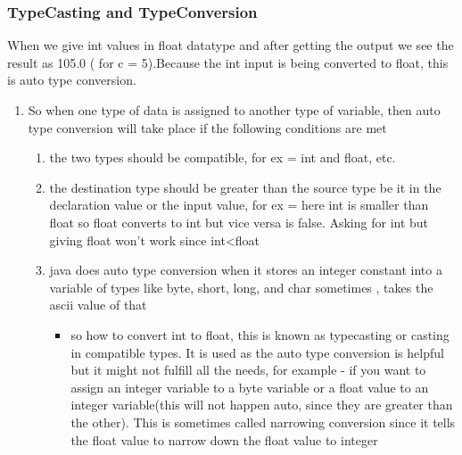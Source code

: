 \documentclass[11pt]{article}
\begin{document}
\subsubsection{TypeCasting and TypeConversion}
\label{sec:org7af905f}
When we give int values in float datatype and after getting the output we see the result as 105.0 ( for c = 5).Because the int input is being converted to float, this is auto type conversion.
\begin{enumerate}
\item So when one type of data is assigned to another type of variable, then auto type conversion will take place if the following conditions are met
\begin{enumerate}
\item the two types should be compatible, for ex = int and float, etc.
\item the destination type should be greater than the source type be it in the declaration value or the input value, for ex = here int is smaller than float so float converts to int but vice versa is false. Asking for int but giving float won't work since int<float
\item java does auto type conversion when it stores an integer constant into a variable of types like byte, short, long, and char sometimes , takes the ascii value of that
\begin{itemize}
\item so how to convert int to float, this is known as typecasting or casting in compatible types. It is used as the auto type conversion is helpful but it might not fulfill all the needs, for example - if you want to assign an integer variable to a byte variable or a float value to an integer variable(this will not happen auto, since they are greater than the other). This is sometimes called narrowing conversion since it tells the float value to narrow down the float value to integer
\end{itemize}
\end{enumerate}
\end{enumerate}
\end{document}
